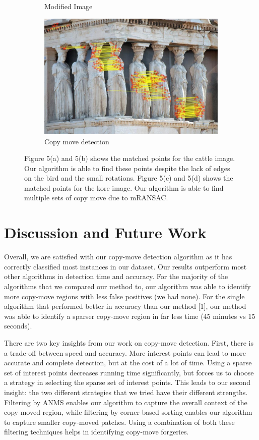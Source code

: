\documentclass[12pt]{article}
\begin{document}
\begin{figure}
\begin{subfigure}{.5\textwidth}
  \caption{Modified Image}
  \label{fig:sub1}
\end{subfigure}%
\begin{subfigure}{.5\textwidth}
  \centering
  \includegraphics[width=.8\linewidth]{./gfx/kore_mod.jpg}
  \caption{Copy move detection}
  \label{fig:sub2}
\end{subfigure}
\caption{Figure 5(a) and 5(b) shows the matched points for the cattle image. Our algorithm is able to find these points despite the lack of edges on the bird and the small rotations. Figure 5(c) and 5(d) shows the matched points for the kore image. Our algorithm is able to find multiple sets of copy move due to mRANSAC.}
\label{fig:test}
\end{figure}

\section*{Discussion and Future Work}
Overall, we are satisfied with our copy-move detection algorithm as it has correctly classified most instances in our dataset. Our results outperform most other algorithms in detection time and accuracy. For the majority of the algorithms that we compared our method to, our algorithm was able to identify more copy-move regions with less false positives (we had none). For the single algorithm that performed better in accuracy than our method [1], our method was able to identify a sparser copy-move region in far less time (45 minutes vs 15 seconds).

There are two key insights from our work on copy-move detection. First, there is a trade-off between speed and accuracy. More interest points can lead to more accurate and complete detection, but at the cost of a lot of time. Using a sparse set of interest points decreases running time significantly, but forces us to choose a strategy in selecting the sparse set of interest points. This leads to our second insight: the two different strategies that we tried have their different strengths. Filtering by ANMS enables our algorithm to capture the overall context of the copy-moved region, while filtering by corner-based sorting enables our algorithm to capture smaller copy-moved patches. Using a combination of both these filtering techniques helps in identifying copy-move forgeries.
\end{document}
